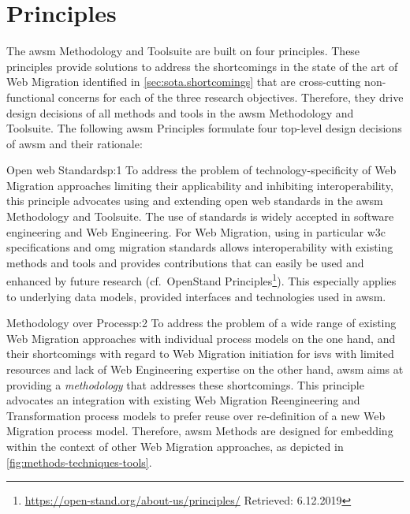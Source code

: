 \vspace{-20pt}
\hypertarget{principles}{%
\section{Principles}\label{principles}}
\vspace{5pt}

The \gls{awsm} Methodology and Toolsuite are built on four principles.
These principles provide solutions to address the shortcomings in the state of the art of \gls{Web Migration} identified in \cref{sec:sota.shortcomings} that are cross-cutting non-functional concerns for each of the three research objectives.
Therefore, they drive design decisions of all methods and tools in the \gls{awsm} Methodology and Toolsuite.
The following \gls{awsm} Principles formulate four top-level design decisions of \gls{awsm} and their rationale:

\vspace{-10pt}
\begin{thesisprinciple}{Open \gls{web} Standards}{p:1}
To address the problem of technology-specificity of \gls{Web Migration} approaches limiting their applicability and inhibiting interoperability, this principle advocates using and extending open \gls{web} standards in the \gls{awsm} Methodology and Toolsuite.
The use of standards is widely accepted in software engineering and \gls{Web Engineering}.
For \gls{Web Migration}, using in particular \gls{w3c} specifications and \gls{omg} migration standards allows interoperability with existing methods and tools and provides contributions that can easily be used and enhanced by future research (cf.~OpenStand Principles\footnote{\url{https://open-stand.org/about-us/principles/} Retrieved: 6.12.2019}).
This especially applies to underlying data models, provided interfaces and technologies used in \gls{awsm}.
\end{thesisprinciple}

\vspace{-10pt}
\begin{thesisprinciple}{Methodology over Process}{p:2}
To address the problem of a wide range of existing \gls{Web Migration} approaches with individual process models on the one hand, and their shortcomings with regard to \gls{Web Migration} initiation for \glspl{isv} with limited resources and lack of \gls{Web Engineering} expertise on the other hand, \gls{awsm} aims at providing a \emph{methodology} that addresses these shortcomings.
This principle advocates an integration with existing \gls{Web Migration} \gls{Reengineering} and \gls{Transformation} process models to prefer reuse over re-definition of a new \gls{Web Migration} process model.
Therefore, \gls{awsm} Methods are designed for embedding within the context of other \gls{Web Migration} approaches, as depicted in \cref{fig:methods-techniques-tools}.
\end{thesisprinciple}

